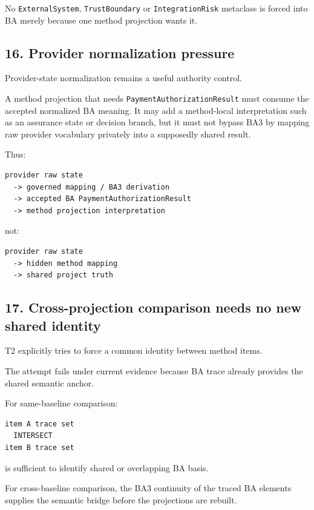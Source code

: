 \documentclass[11pt,a4paper]{article}
\begin{document}
No \texttt{ExternalSystem}, \texttt{TrustBoundary} or
\texttt{IntegrationRisk} metaclass is forced into BA merely because one
method projection wants it.

\subsection{16. Provider normalization
pressure}\label{16-provider-normalization-pressure}

Provider-state normalization remains a useful authority control.

A method projection that needs \texttt{PaymentAuthorizationResult} must
consume the accepted normalized BA meaning. It may add a method-local
interpretation such as an assurance state or decision branch, but it
must not bypass BA3 by mapping raw provider vocabulary privately into a
supposedly shared result.

Thus:

\begin{verbatim}
provider raw state
  -> governed mapping / BA3 derivation
  -> accepted BA PaymentAuthorizationResult
  -> method projection interpretation
\end{verbatim}

not:

\begin{verbatim}
provider raw state
  -> hidden method mapping
  -> shared project truth
\end{verbatim}

\subsection{17. Cross-projection comparison needs no new shared
identity}\label{17-cross-projection-comparison-needs-no-new-shared-identity}

T2 explicitly tries to force a common identity between method items.

The attempt fails under current evidence because BA trace already
provides the shared semantic anchor.

For same-baseline comparison:

\begin{verbatim}
item A trace set
  INTERSECT
item B trace set
\end{verbatim}

is sufficient to identify shared or overlapping BA basis.

For cross-baseline comparison, the BA3 continuity of the traced BA
elements supplies the semantic bridge before the projections are
rebuilt.
\end{document}
